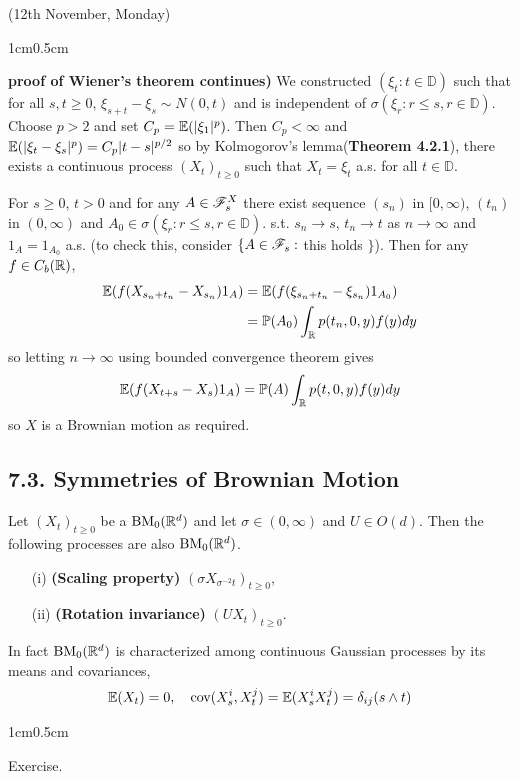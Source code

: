 \documentclass[12pt,a4paper]{report}
\newenvironment{proof}
{\begin{changemargin}{1cm}{0.5cm} 
	}%
	{\end{changemargin}
}
\begin{document}
\newday

(12th November, Monday)
\s

\begin{proof}
\textbf{proof of Wiener's theorem continues)} We constructed $(\xi_t : t\in \mathbb{D})$ such that for all $s,t\geq 0$, $\xi_{s+t} -\xi_s \sim N(0,t)$ and is independent of $\sigma(\xi_r : r\leq s , r\in \mathbb{D})$. Choose $p>2$ and set $C_p = \mathbb{E}(|\xi_1|^p)$. Then $C_p <\infty$ and $\mathbb{E}(|\xi_t - \xi_s|^p) = C_p|t-s|^{p/2}$ so by Kolmogorov's lemma(\textbf{Theorem 4.2.1}), there exists a continuous process $(X_t)_{t\geq 0}$ such that $X_t = \xi_t$ a.s. for all $t\in \mathbb{D}$.
\s

For $s\geq 0$, $t>0$ and for any $A\in \mathscr{F}_s^X$ there exist sequence $(s_n)$ in $[0,\infty)$, $(t_n)$ in $(0,\infty)$ and $A_0 \in \sigma(\xi_r : r\leq s, r \in \mathbb{D} )$. s.t. $s_n \rightarrow s$, $t_n \rightarrow t$ as $n\rightarrow \infty$ and $1_A =1_{A_0}$ a.s. (to check this, consider $\{ A \in \mathscr{F}_s : $ this holds $\}$). Then for any $f\in C_b(\mathbb{R})$,
\begin{align*}
\mathbb{E}(f (X_{s_n + t_n} - X_{s_n})1_A) &= \mathbb{E}( f(\xi_{s_n + t_n} - \xi_{s_n})1_{A_0} ) \\
&= \mathbb{P}(A_0) \int_{\mathbb{R}} p(t_n, 0,y) f(y)dy
\end{align*}
so letting $n\rightarrow \infty$ using bounded convergence theorem gives
\begin{align*}
\mathbb{E}(f(X_{t+s}-X_s)1_{A}) = \mathbb{P}(A) \int_{\mathbb{R}} p(t,0,y) f(y)dy
\end{align*}
so $X$ is a Brownian motion as required.

\eop
\end{proof}

\subsection*{7.3. Symmetries of Brownian Motion}

 Let $(X_t)_{t\geq 0}$ be a $\text{BM}_0(\mathbb{R}^d)$ and let $\sigma \in (0,\infty)$ and $U\in O(d)$. Then the following processes are also $\text{BM}_0(\mathbb{R}^d)$.
\begin{itemize}
\item[(i)] \textbf{(Scaling property)} $(\sigma X_{\sigma^{-2}t})_{t\geq 0}$,
\item[(ii)] \textbf{(Rotation invariance)} $(UX_t)_{t\geq 0}$.
\end{itemize}
In fact $\text{BM}_0(\mathbb{R}^d)$ is characterized among continuous Gaussian processes by its means and covariances,
\begin{align*}
\mathbb{E}(X_t) =0, \quad \text{cov}(X_s^i, X_t^j) = \mathbb{E}(X^i_s X^j_t) = \delta_{ij} (s\wedge t)
\end{align*}
\begin{proof}
\pf Exercise.
\end{proof}
\end{document}
